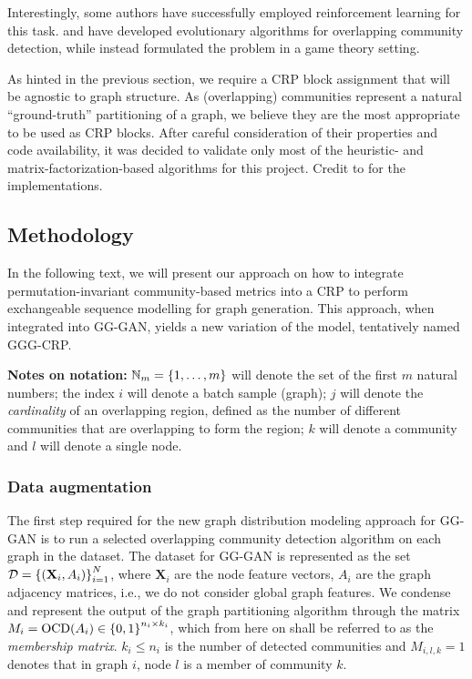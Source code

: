 Interestingly, some authors have successfully employed reinforcement learning for this task. \cite{zhang_mixed_2017} and \cite{bello-orgaz_multi-objective_2018} have developed evolutionary algorithms for overlapping community detection, while \cite{wang_effective_2021} instead formulated the problem in a game theory setting. 

As hinted in the previous section, we require a CRP block assignment that will be agnostic to graph structure. As (overlapping) communities represent a natural \enquote{ground-truth} partitioning of a graph, we believe they are the most appropriate to be used as CRP blocks. After careful consideration of their properties and code availability, it was decided to validate only most of the heuristic- and matrix-factorization-based algorithms for this project. Credit to \cite{csardi_igraph_2006, rozemberczki_karate_2020, li_local_2018, janchevski_dnmf-python_2022} for the implementations.

\subsection{Methodology}
\label{sec:methodology_gggcrp}

In the following text, we will present our approach on how to integrate permutation-invariant community-based metrics into a CRP to perform exchangeable sequence modelling for graph generation. This approach, when integrated into GG-GAN, yields a new variation of the model, tentatively named GGG-CRP. 

\textbf{Notes on notation:} $\mathbb{N}_{m} = \mathopen{}\left\{1,\dots,m\right\}$ will denote the set of the first $m$ natural numbers; the index $i$ will denote a batch sample (graph); $j$ will denote the \emph{cardinality} of an overlapping region, defined as the number of different communities that are overlapping to form the region; $k$ will denote a community and $l$ will denote a single node.

\subsubsection{Data augmentation}
The first step required for the new graph distribution modeling approach for GG-GAN is to run a selected overlapping community detection algorithm on each graph in the dataset. The dataset for GG-GAN is represented as the set $\mathcal{D} = \mathopen{}\left\{\mathopen{}\left(\mathbf{X}_i, A_i\right)\right\}_{i=1}^{N}$, where $\mathbf{X}_i$ are the node feature vectors, $A_i$ are the graph adjacency matrices, i.e., we do not consider global graph features. We condense and represent the output of the graph partitioning algorithm through the matrix $M_i = \text{OCD}\mathopen{}\left(A_i\right) \in \mathopen{}\left\{0, 1\right\}^{n_i \times k_i}$, which from here on shall be referred to as the \emph{membership matrix}. $k_i \leq n_i$ is the number of detected communities and $M_{i,l,k}=1$ denotes that in graph $i$, node $l$ is a member of community $k$.


